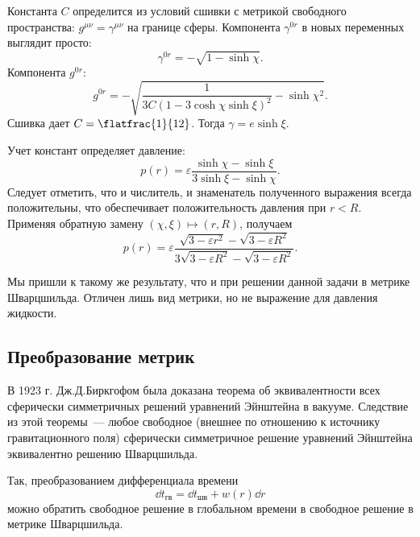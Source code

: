 \documentclass[\docroot/reports/draft/report.tex]{subfiles}
\begin{document}
    Константа $C$ определится из условий сшивки с метрикой свободного пространства: $g^{\mu\nu} = \gamma^{\mu\nu}$ на границе сферы. Компонента $\gamma^{0r}$ в новых переменных выглядит просто:
    \begin{equation*}
        \gamma^{0r} = - \sqrt{1 - \sinh\chi} .
    \end{equation*}
    Компонента $g^{0r}$:
    \begin{equation*}
        g^{0r} = - \sqrt{
            \frac{1}{3 C (1 - 3 \cosh\chi \sinh\xi)^2} - \sinh\chi^2
        } .
    \end{equation*}
    Сшивка дает $C = \flatfrac{1}{12}$. Тогда $\gamma = e \sinh\xi$.

    Учет констант определяет давление:
    \begin{equation*}
        p(r) = \varepsilon \frac{\sinh\chi - \sinh\xi}{3\sinh\xi - \sinh\chi} .
    \end{equation*}
    Следует отметить, что и числитель, и знаменатель полученного выражения всегда положительны, что обеспечивает положительность давления при $r < R$. Применяя обратную замену $(\chi,\xi) \mapsto (r,R)$, получаем
    \begin{equation*}
        p(r) = \varepsilon \frac{\sqrt{3 - \varepsilon r^2} - \sqrt{3 - \varepsilon R^2}}{3 \sqrt{3 - \varepsilon R^2} - \sqrt{3 - \varepsilon R^2}} .
    \end{equation*}

    Мы пришли к такому же результату, что и при решении данной задачи в метрике Шварцшильда. Отличен лишь вид метрики, но не выражение для давления жидкости.

\subsection{Преобразование метрик}

    В 1923 г. Дж.Д.Биркгофом была доказана теорема об эквивалентности всех сферически симметричных решений уравнений Эйнштейна в вакууме. Следствие из этой теоремы~--- любое свободное (внешнее по отношению к источнику гравитационного поля) сферически симметричное решение уравнений Эйнштейна эквивалентно решению Шварцшильда.

    Так, преобразованием дифференциала времени
    \begin{equation}\label{eq:dtdtdr}
        \dd{t}_\text{гв} = \dd{t}_\text{шв} + w(r) \dd{r}
    \end{equation}
    можно обратить свободное решение в глобальном времени в свободное решение в метрике Шварцшильда.
\end{document}
